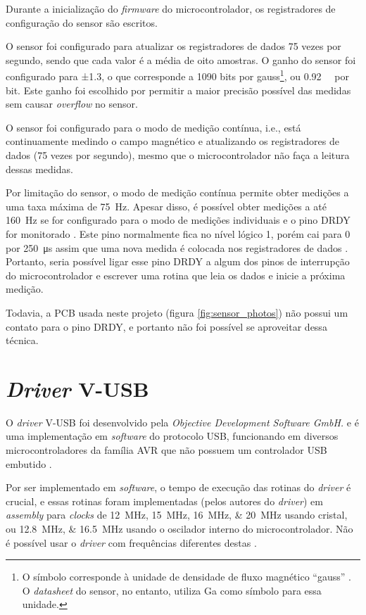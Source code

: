 \documentclass[brazil,pagestart=firstchapter]{abnt}
\makeatletter
\newcommand*{\ie}{i.e.\@\xspace}
\newcommand*{\VUSB}{\mbox{V-USB}\xspace}
\makeatother
\begin{document}
Durante a inicialização do \textit{firmware} do microcontrolador, os
registradores de configuração do sensor são escritos.

O sensor foi configurado para atualizar os registradores de dados 75 vezes
por segundo, sendo que cada valor é a média de oito amostras. O ganho do
sensor foi configurado para ±\SI{1.3}{\gauss}, o que corresponde a
\num{1090} bits por gauss\footnote{
	O símbolo \si{\gauss} corresponde à unidade de densidade de fluxo
	magnético ``gauss'' \cite{SI}. O \textit{datasheet} do sensor,
	no entanto, utiliza Ga como símbolo para essa unidade.
}, ou \SI{0.92}{\milli\gauss} por bit. Este ganho foi escolhido por permitir
a maior precisão possível das medidas sem causar \textit{overflow} no
sensor.

O sensor foi configurado para o modo de medição contínua, \ie, está
continuamente medindo o campo magnético e atualizando os registradores de
dados (75 vezes por segundo), mesmo que o microcontrolador não faça a
leitura dessas medidas.

Por limitação do sensor, o modo de medição contínua permite obter medições a
uma taxa máxima de \SI{75}{\hertz}. Apesar disso, é possível obter medições
a até \SI{160}{\hertz} se for configurado para o modo de medições
individuais e o pino DRDY for monitorado \cite{HMC5883L}. Este pino
normalmente fica no nível lógico 1, porém cai para 0 por
\SI{250}{\micro\second} assim que uma nova medida é colocada nos
registradores de dados \cite{HMC5883L}.  Portanto, seria possível ligar esse
pino DRDY a algum dos pinos de interrupção do microcontrolador e escrever
uma rotina que leia os dados e inicie a próxima medição.

Todavia, a \ac{PCB} usada neste projeto (figura \ref{fig:sensor_photos}) não
possui um contato para o pino DRDY, e portanto não foi possível se
aproveitar dessa técnica.


\section{\textit{Driver} \VUSB}
\label{sec:vusb}

O \textit{driver} \VUSB foi desenvolvido pela \textit{Objective Development
Software GmbH.} e é uma implementação em \textit{software} do protocolo
\ac{USB}, funcionando em diversos microcontroladores da família AVR que não
possuem um controlador \ac{USB} embutido \cite{VUSBdriver}.

Por ser implementado em \textit{software}, o tempo de execução das rotinas
do \textit{driver} é crucial, e essas rotinas foram implementadas (pelos
autores do \textit{driver}) em \textit{assembly} para \textit{clocks} de
\SIlist[list-final-separator={ ou }]{12; 15; 16; 20}{\mega\hertz} usando
cristal, ou \SIlist[list-final-separator={ ou }]{12.8; 16.5}{\mega\hertz}
usando o oscilador interno do microcontrolador. Não é possível usar o
\textit{driver} com frequências diferentes destas \cite{VUSBdriver}.
\end{document}

